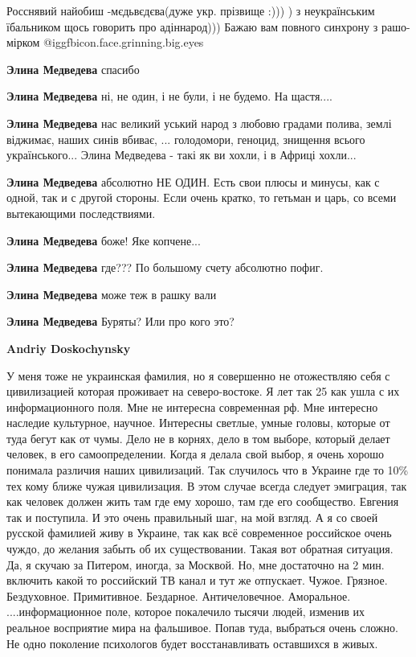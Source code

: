 \begin{itemize}
\begin{itemize}
Росснявий найобиш -мєдьвєдєва(дуже укр. прізвище :))) ) з неукраїнським
їбальником щось говорить про адіннарод))) Бажаю вам повного синхрону з
рашо-мірком  @igg{fbicon.face.grinning.big.eyes} 

\textbf{Элина Медведева} спасибо

\textbf{Элина Медведева} ні, не один, і не були, і не будемо. На щастя....

\textbf{Элина Медведева} нас великий уський народ з любовю градами полива, землі віджимає, наших синів вбиває, ... голодомори, геноцид, знищення всього українського... Элина Медведева - такі як ви хохли, і в Африці хохли...

\textbf{Элина Медведева} абсолютно НЕ ОДИН. Есть свои плюсы и минусы, как с одной, так и с другой стороны. Если очень кратко, то гетьман и царь, со всеми вытекающими последствиями.

\textbf{Элина Медведева} боже! Яке копчене...

\textbf{Элина Медведева} где??? По большому счету абсолютно пофиг.

\textbf{Элина Медведева} може теж в рашку вали

\textbf{Элина Медведева} Буряты? Или про кого это?

\textbf{Andriy Doskochynsky} 

У меня тоже не украинская фамилия, но я совершенно не отожествляю себя с
цивилизацией которая проживает на северо-востоке. Я лет так 25 как ушла с их
информационного поля. Мне не интересна современная рф. Мне интересно наследие
культурное, научное. Интересны светлые, умные головы, которые от туда бегут как
от чумы. Дело не в корнях, дело в том выборе, который делает человек, в его
самоопределении. Когда я делала свой выбор, я очень хорошо понимала различия
наших цивилизаций. Так случилось что в Украине где то 10\% тех кому ближе чужая
цивилизация. В этом случае всегда следует эмиграция, так как человек должен
жить там где ему хорошо, там где его сообщество. Евгения так и поступила. И это
очень правильный шаг, на мой взгляд. А я со своей русской фамилией живу в
Украине, так как всё современное российское очень чуждо, до желания забыть об
их существовании. Такая вот обратная ситуация. Да, я скучаю за Питером, иногда,
за Москвой. Но, мне достаточно на 2 мин. включить какой то российский ТВ канал
и тут же отпускает. Чужое. Грязное. Бездуховное. Примитивное. Бездарное.
Античеловечное. Аморальное. ....информационное поле, которое покалечило тысячи
людей, изменив их реальное восприятие мира на фальшивое. Попав туда, выбраться
очень сложно. Не одно поколение психологов будет восстанавливать оставшихся в
живых.



\end{itemize}
\end{itemize}
